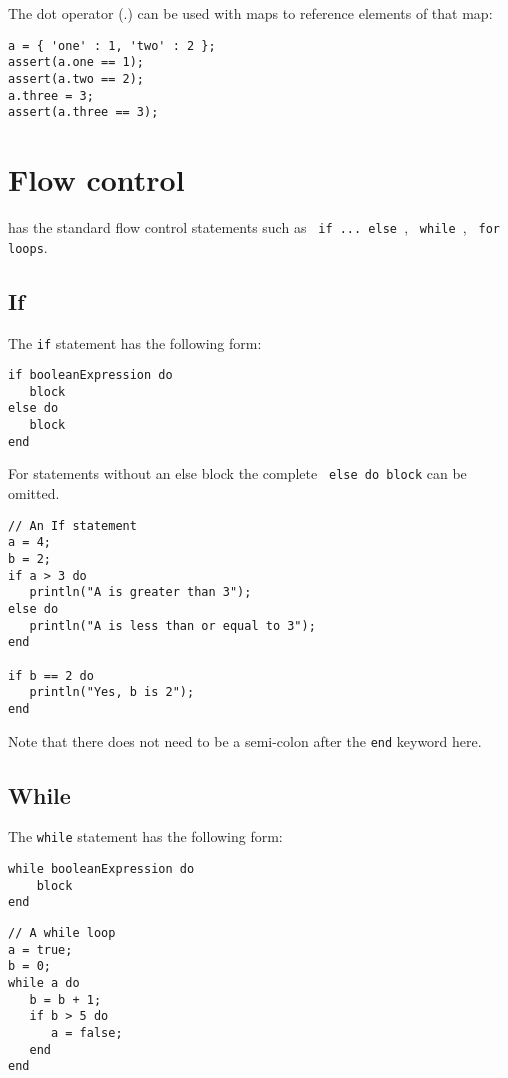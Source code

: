 The dot operator ($.$) can be used with maps to reference elements of that map:

\begin{lstlisting}[caption={Dot operator on maps}]
a = { 'one' : 1, 'two' : 2 };
assert(a.one == 1);
assert(a.two == 2);
a.three = 3;
assert(a.three == 3);
\end{lstlisting}

\chapter{Flow control}
\Reflex has the standard flow control statements such as \Verb+ if ... else +, \verb+ while +, \verb+ for loops+.
\section{If}
The \Reflex \Verb+if+  statement has the following form:
\begin{Verbatim}
if booleanExpression do
   block
else do
   block
end
\end{Verbatim}
For statements without an else  block the complete \Verb+ else do block+ can be omitted.

\begin{lstlisting}[caption={If statement}]
// An If statement
a = 4;
b = 2;
if a > 3 do
   println("A is greater than 3");
else do
   println("A is less than or equal to 3");
end

if b == 2 do
   println("Yes, b is 2");
end
\end{lstlisting}
Note that there does not need to be a semi-colon after the \Verb+end+ keyword here.
\section{While}
The \Reflex \Verb+while+ statement has the following form:
\begin{Verbatim}
while booleanExpression do
    block
end
\end{Verbatim}

\begin{lstlisting}[caption={While statement}]
// A while loop
a = true;
b = 0;
while a do
   b = b + 1;
   if b > 5 do
      a = false;
   end
end
\end{lstlisting}
